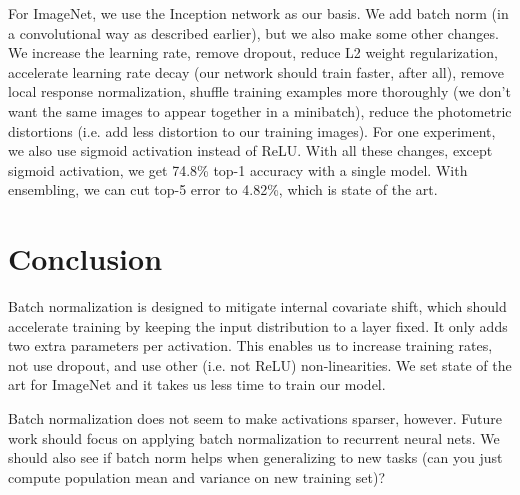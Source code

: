 \documentclass[a4paper]{article}
\begin{document}
For ImageNet, we use the Inception network as our basis. We add batch norm (in
a convolutional way as described earlier), but we also make some other changes.
We increase the learning rate, remove dropout, reduce L2 weight regularization,
accelerate learning rate decay (our network should train faster, after all),
remove local response normalization, shuffle training examples more thoroughly
(we don't want the same images to appear together in a minibatch),
reduce the photometric distortions (i.e. add less distortion to our training
images). For one experiment, we also use sigmoid activation instead of ReLU.
With all these changes, except sigmoid activation, we get 74.8\% top-1 accuracy
with a single model. With ensembling, we can cut top-5 error to 4.82\%, which is
state of the art.

\section{Conclusion}
Batch normalization is designed to mitigate internal covariate shift, which
should accelerate training by keeping the input distribution to a layer
fixed. It only adds two extra parameters per activation. This enables us to
increase training rates, not use dropout, and use other (i.e. not ReLU)
non-linearities. We set state of the art for ImageNet and it takes us less time
to train our model.

Batch normalization does not seem to make activations sparser, however. Future
work should focus on applying batch normalization to recurrent neural nets. We
should also see if batch norm helps when generalizing to new tasks (can you just
compute population mean and variance on new training set)?
\end{document}
